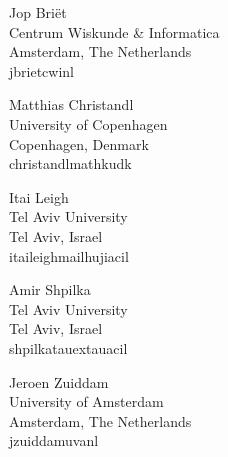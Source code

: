 \documentclass{daj}
\begin{document}
\begin{dajauthors}
\begin{authorinfo}[briet]
Jop Briët\\
Centrum Wiskunde \& Informatica\\
Amsterdam, The Netherlands\\
j\imagedot{}briet\imageat{}cwi\imagedot{}nl\\
\end{authorinfo}
\begin{authorinfo}[christandl]
Matthias Christandl\\
University of Copenhagen\\
Copenhagen, Denmark\\
christandl\imageat{}math\imagedot{}ku\imagedot{}dk
\end{authorinfo}
\begin{authorinfo}[leigh]
  Itai Leigh\\
  Tel Aviv University\\
  Tel Aviv, Israel\\
  itai\imagedot{}leigh\imageat{}mail\imagedot{}huji\imagedot{}ac\imagedot{}il
\end{authorinfo}
\begin{authorinfo}[shpilka]
  Amir Shpilka\\
  Tel Aviv University\\
  Tel Aviv, Israel\\
  shpilka\imageat{}tauex\imagedot{}tau\imagedot{}ac\imagedot{}il
\end{authorinfo}
\begin{authorinfo}[zuiddam]
  Jeroen Zuiddam\\
  University of Amsterdam\\
  Amsterdam, The Netherlands\\
  j\imagedot{}zuiddam\imageat{}uva\imagedot{}nl
\end{authorinfo}

\end{dajauthors}
\end{document}
